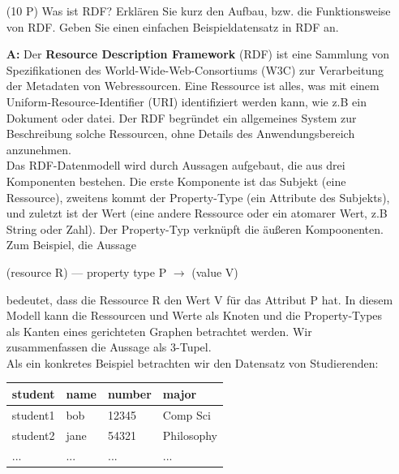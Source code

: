 \documentclass[12pt]{report}
\newcommand{\answer}{\textbf{A:}}
\begin{document}
\begin{enumerate}

\item[(10 P)] Was ist RDF? Erklären Sie kurz den Aufbau, bzw. die Funktionsweise von RDF. Geben Sie einen einfachen Beispieldatensatz in RDF an.
\item[\answer]
  Der \textbf{Resource Description Framework} (RDF) ist eine Sammlung von Spezifikationen des World-Wide-Web-Consortiums (W3C) zur Verarbeitung der Metadaten von Webressourcen. Eine Ressource ist alles, was mit einem Uniform-Resource-Identifier (URI) identifiziert werden kann, wie z.B ein Dokument oder datei. Der RDF begründet ein allgemeines System zur Beschreibung solche Ressourcen, ohne Details des Anwendungsbereich anzunehmen.\\

  Das RDF-Datenmodell wird durch Aussagen aufgebaut, die aus drei Komponenten bestehen. Die erste Komponente ist das Subjekt (eine Ressource), zweitens kommt der Property-Type (ein Attribute des Subjekts), und zuletzt ist der Wert (eine andere Ressource oder ein atomarer Wert, z.B String oder Zahl). Der Property-Typ verknüpft die äußeren Kompoonenten. Zum Beispiel, die Aussage

  \begin{center}
    (resource R) --- property type P $\rightarrow$ (value V)
  \end{center}

  bedeutet, dass die Ressource R den Wert V für das Attribut P hat. In diesem Modell kann die Ressourcen und Werte als Knoten und die Property-Types als Kanten eines gerichteten Graphen betrachtet werden. Wir zusammenfassen die Aussage als 3-Tupel.\\

  Als ein konkretes Beispiel betrachten wir den Datensatz von Studierenden:

  \begin{center}
    \begin{tabular}{l l l l}
      \textbf{student} & \textbf{name} & \textbf{number} & \textbf{major} \\
      \hline
      student1 & bob & 12345 & Comp Sci \\
      student2 & jane & 54321 & Philosophy\\
      ... & ... & ... & ...
    \end{tabular}
  \end{center}


\end{enumerate}
\end{document}
